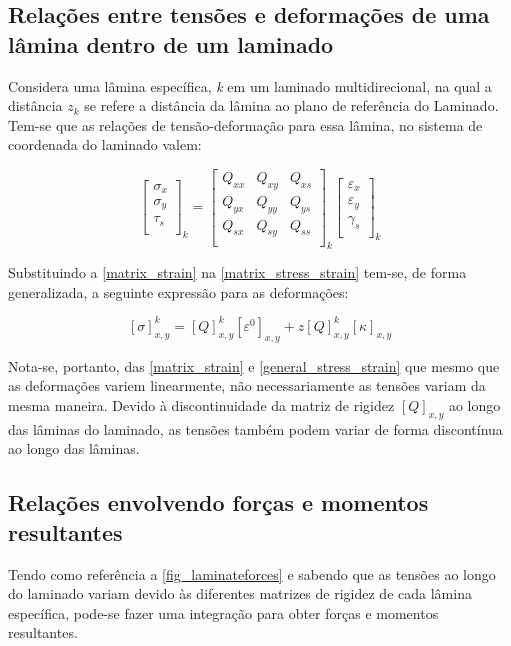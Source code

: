 \subsection{Relações entre tensões e deformações de uma lâmina dentro de um laminado}
Considera uma lâmina específica, \emph{k} em um laminado multidirecional, na qual a distância \emph{$z_k$} se refere a distância da lâmina ao plano de referência do Laminado. Tem-se que as relações de tensão-deformação para essa lâmina, no sistema de coordenada do laminado valem:

\begin{equation} \label{matrix_stress_strain}
\begin{bmatrix}
    \sigma_{x} \\
    \sigma_{y} \\
    \tau_{s} \\
\end{bmatrix}_k
=
\begin{bmatrix}
		Q_{xx} & Q_{xy} & Q_{xs} \\
		Q_{yx} & Q_{yy} & Q_{ys} \\
		Q_{sx} & Q_{sy} & Q_{ss} \\
\end{bmatrix}_k
\begin{bmatrix}
    \varepsilon_{x} \\
    \varepsilon_{y} \\
    \gamma_{s} \\
\end{bmatrix}_k
\end{equation}

Substituindo a \autoref{matrix_strain} na \autoref{matrix_stress_strain} tem-se, de forma generalizada, a seguinte expressão para as deformações:

\begin{equation} \label{general_stress_strain}
		[\sigma]^k_{x,y}=[Q]^k_{x,y}[\varepsilon^0]_{x,y}+z[Q]^k_{x,y}[\kappa]_{x,y}
\end{equation}

Nota-se, portanto, das \autoref{matrix_strain} e \autoref{general_stress_strain} que mesmo que as deformações variem linearmente, não necessariamente as tensões variam da mesma maneira. Devido à discontinuidade da matriz de rigidez $[Q]_{x,y}$ ao longo das lâminas do laminado, as tensões também podem variar de forma discontínua ao longo das lâminas.

\subsection{Relações envolvendo forças e momentos resultantes}
Tendo como referência a \autoref{fig_laminateforces} e sabendo que as tensões ao longo do laminado variam devido às diferentes matrizes de rigidez de cada lâmina específica, pode-se fazer uma integração para obter forças e momentos resultantes.

